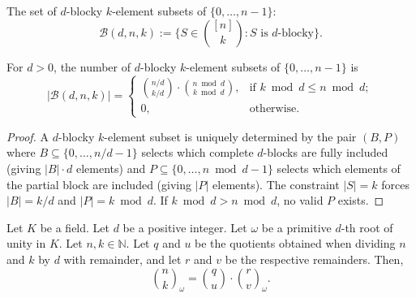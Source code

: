 \begin{definition}
\label{def.blockySubsets}
\leanhelper
\leanok
The set of $d$-blocky $k$-element subsets of $\{0, \ldots, n-1\}$:
\[
\mathcal{B}(d, n, k) :=
\bigl\{S \in \binom{[n]}{k} : S \text{ is } d\text{-blocky}\bigr\}.
\]
\end{definition}

\begin{lemma}
\label{lem.blocky_subsets_count}
\leanhelper
\leanok
For $d > 0$, the number of $d$-blocky $k$-element subsets of
$\{0, \ldots, n-1\}$ is
\[
|\mathcal{B}(d, n, k)|
= \begin{cases}
\binom{n/d}{k/d} \cdot \binom{n \bmod d}{k \bmod d},
  & \text{if } k \bmod d \leq n \bmod d; \\
0, & \text{otherwise.}
\end{cases}
\]
\end{lemma}

\begin{proof}
\leanok
A $d$-blocky $k$-element subset is uniquely determined by the pair
$(B, P)$ where $B \subseteq \{0, \ldots, n/d - 1\}$ selects which
complete $d$-blocks are fully included (giving $|B| \cdot d$ elements)
and $P \subseteq \{0, \ldots, n \bmod d - 1\}$ selects which elements
of the partial block are included (giving $|P|$ elements).
The constraint $|S| = k$ forces $|B| = k / d$ and $|P| = k \bmod d$.
If $k \bmod d > n \bmod d$, no valid $P$ exists.
\end{proof}

\begin{theorem}
\label{thm.sign.q-lucas}
\leantarget
\leanok
Let $K$ be a field. Let $d$ be a positive integer. Let $\omega$ be a
primitive $d$-th root of unity in $K$. Let $n, k \in \mathbb{N}$. Let
$q$ and $u$ be the quotients obtained when dividing $n$ and $k$ by $d$
with remainder, and let $r$ and $v$ be the respective remainders. Then,
\[
\binom{n}{k}_{\omega}
= \binom{q}{u} \cdot \binom{r}{v}_{\omega}.
\]
\end{theorem}

